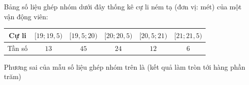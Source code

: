 \begin{ex}
Bảng số liệu ghép nhóm dưới đây thống kê cự li ném tạ (đơn vị: mét) của một vận động viên:
\begin{center}
\begin{tabular}{|c|c|c|c|c|c|}\hline
Cự li & $[19;19{,}5)$ & $[19{,}5;20)$ & $[20;20{,}5)$ & $[20{,}5;21)$ & $[21;21{,}5)$\\\hline
Tần số & $13$ & $45$ & $24$ & $12$ & $6$\\\hline
\end{tabular}
\end{center}
Phương sai của mẫu số liệu ghép nhóm trên là (kết quả làm tròn tới hàng phần trăm)
\end{ex}
